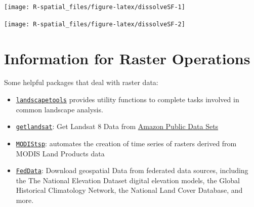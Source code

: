 \documentclass[
  11pt,
]{book}
\newenvironment{Shaded}{\begin{snugshade}}{\end{snugshade}}
\newcommand{\AttributeTok}[1]{\textcolor[rgb]{0.77,0.63,0.00}{#1}}
\newcommand{\ConstantTok}[1]{\textcolor[rgb]{0.00,0.00,0.00}{#1}}
\newcommand{\DecValTok}[1]{\textcolor[rgb]{0.00,0.00,0.81}{#1}}
\newcommand{\FunctionTok}[1]{\textcolor[rgb]{0.00,0.00,0.00}{#1}}
\newcommand{\NormalTok}[1]{#1}
\newcommand{\OtherTok}[1]{\textcolor[rgb]{0.56,0.35,0.01}{#1}}
\newcommand{\SpecialCharTok}[1]{\textcolor[rgb]{0.00,0.00,0.00}{#1}}
\newcommand{\StringTok}[1]{\textcolor[rgb]{0.31,0.60,0.02}{#1}}
\providecommand{\tightlist}{%
  \setlength{\itemsep}{0pt}\setlength{\parskip}{0pt}}
\begin{document}
\texttt{[image: R-spatial\_files/figure-latex/dissolveSF-1]}

\begin{Shaded}
\end{Shaded}

\texttt{[image: R-spatial\_files/figure-latex/dissolveSF-2]}

\hypertarget{information-for-raster-operations}{%
\section{Information for Raster Operations}\label{information-for-raster-operations}}

Some helpful packages that deal with raster data:

\begin{itemize}
\tightlist
\item
  \href{https://CRAN.R-project.org/package=landscapetools}{\texttt{landscapetools}} provides utility functions to complete tasks involved in common landscape analysis.
\item
  \href{https://CRAN.R-project.org/package=getlandsat}{\texttt{getlandsat}}: Get Landsat 8 Data from \href{https://registry.opendata.aws/landsat-8/}{Amazon Public Data Sets}
\item
  \href{https://CRAN.R-project.org/package=MODIStsp}{\texttt{MODIStsp}}: automates the creation of time series of rasters derived from MODIS Land Products data
\item
  \href{https://cran.r-project.org/package=FedData}{\texttt{FedData}}: Download geospatial Data from federated data sources, including the The National Elevation Dataset digital elevation models, the Global Historical Climatology Network, the National Land Cover Database, and more.
\end{itemize}
\end{document}

